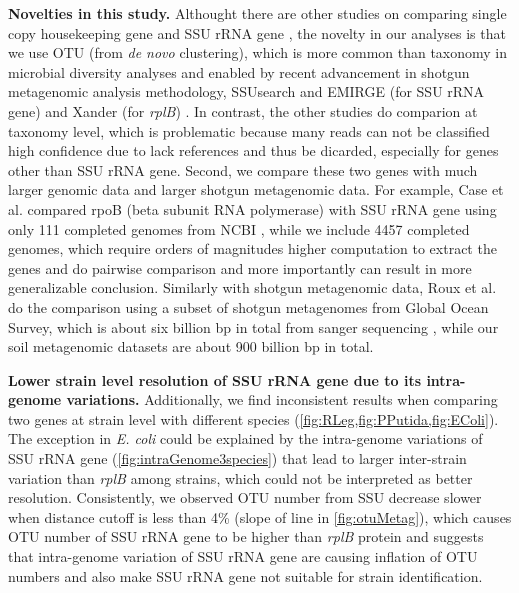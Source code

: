 \documentclass[]{msu-thesis}
\begin{document}
\textbf{Novelties in this study. }
Althought there are other studies on comparing single copy housekeeping gene and SSU rRNA gene \cite{case_use_2007,roux_comparison_2011}, the novelty in our analyses is that we use OTU (from \textit{de novo} clustering), which is more common than taxonomy in microbial diversity analyses and enabled by recent advancement in shotgun metagenomic analysis methodology, SSUsearch and EMIRGE (for SSU rRNA gene) \cite{guo_microbial_2015,miller_short-read_2013} and Xander (for \textit{rplB}) \cite{wang_xander:_2015}. In contrast, the other studies do comparion at taxonomy level, which is problematic because many reads can not be classified high confidence due to lack references and thus be dicarded, especially for genes other than SSU rRNA gene. Second, we compare these two genes with much larger genomic data and larger shotgun metagenomic data. For example, Case et al. compared rpoB (beta subunit RNA polymerase) with SSU rRNA gene using only 111 completed genomes from NCBI \cite{case_use_2007}, while we include 4457 completed genomes, which require orders of magnitudes higher computation to extract the genes and do pairwise comparison and more importantly can result in more generalizable conclusion. Similarly with shotgun metagenomic data, Roux et al. do the comparison using a subset of shotgun metagenomes from Global Ocean Survey, which is about six billion bp in total from sanger sequencing \cite{roux_comparison_2011,rusch_sorcerer_2007}, while our soil metagenomic datasets are about 900 billion bp in total. 


\textbf{Lower strain level resolution of SSU rRNA gene due to its intra-genome variations. }
Additionally, we find inconsistent results when comparing two genes at strain level with different species (\cref{fig:RLeg,fig:PPutida,fig:EColi}). The exception in \textit{E. coli} could be explained by the intra-genome variations of SSU rRNA gene (\cref{fig:intraGenome3species}) that lead to larger inter-strain variation than \textit{rplB} among strains, which could not be interpreted as better resolution. Consistently, we observed OTU number from SSU decrease slower when distance cutoff is less than 4\% (slope of line in \cref{fig:otuMetag}), which causes OTU number of SSU rRNA gene to be higher than \textit{rplB} protein and suggests that intra-genome variation of SSU rRNA gene are causing inflation of OTU numbers \cite{sun_intragenomic_2013} and also make SSU rRNA gene not suitable for strain identification.
\end{document}
